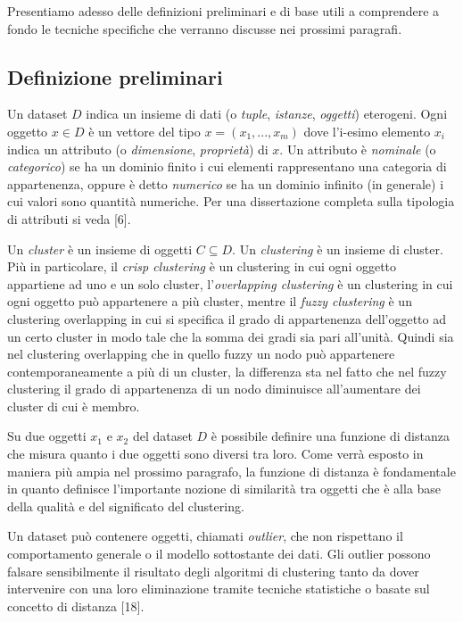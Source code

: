 Presentiamo adesso delle definizioni preliminari e di base utili a comprendere a fondo le tecniche specifiche che verranno discusse nei prossimi paragrafi.

\subsection{Definizione preliminari}
Un dataset $ D $ indica un insieme di dati (o \textit{tuple}, \textit{istanze}, \textit{oggetti}) eterogeni. Ogni oggetto $ x \in D $ \`e un vettore del tipo $ x = (x_{1},..., x_{m}) $ dove l'i-esimo elemento $ x_{i} $ indica un attributo (o \textit{dimensione}, \textit{propriet\`a}) di $ x $. Un attributo \`e \textit{nominale} (o \textit{categorico}) se ha un dominio finito i cui elementi rappresentano una categoria di appartenenza, oppure \`e detto \textit{numerico} se ha un dominio infinito (in generale) i cui valori sono quantit\`a numeriche. 
Per una dissertazione completa sulla tipologia di attributi si veda [6].

Un \textit{cluster} \`e un insieme di oggetti $ C \subseteq D $. Un \textit{clustering} \`e un insieme di cluster. Pi\`u in particolare, il \textit{crisp clustering} \`e un clustering in cui ogni oggetto appartiene ad uno e un solo cluster, l'\textit{overlapping clustering} \`e un clustering in cui ogni oggetto pu\`o appartenere a pi\`u cluster, mentre il \textit{fuzzy clustering} \`e un clustering overlapping in cui si specifica il grado di appartenenza dell'oggetto ad un certo cluster in modo tale che la somma dei gradi sia pari all'unit\`a. Quindi sia nel clustering overlapping che in quello fuzzy un nodo pu\`o appartenere contemporaneamente a pi\`u di un cluster, la differenza sta nel fatto che nel fuzzy clustering il grado di appartenenza di un nodo diminuisce all'aumentare dei cluster di cui \`e membro.

Su due oggetti $ x_{1} $ e $ x_{2} $ del dataset $ D $ \`e possibile definire una funzione di distanza che misura quanto i due oggetti sono diversi tra loro. Come verr\`a esposto in maniera pi\`u ampia nel prossimo paragrafo, la funzione di distanza \`e fondamentale in quanto definisce l'importante nozione di similarit\`a tra oggetti che \`e alla base della qualit\`a e del significato del clustering.

Un dataset pu\`o contenere oggetti, chiamati \textit{outlier}, che non rispettano il comportamento generale o il modello sottostante dei dati. Gli outlier possono falsare sensibilmente il risultato degli algoritmi di clustering tanto da dover intervenire con una loro eliminazione tramite tecniche statistiche o basate sul concetto di distanza [18].

